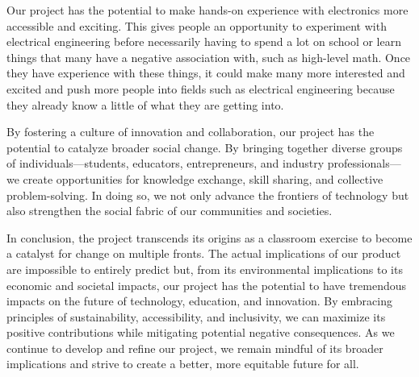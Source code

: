 Our project has the potential to make hands-on experience with electronics more accessible and exciting. This gives people an opportunity to experiment with electrical engineering before necessarily having to spend a lot on school or learn things that many have a negative association with, such as high-level math. Once they have experience with these things, it could make many more interested and excited and push more people into fields such as electrical engineering because they already know a little of what they are getting into.

By fostering a culture of innovation and collaboration, our project has the potential to catalyze broader social change. By bringing together diverse groups of individuals—students, educators, entrepreneurs, and industry professionals—we create opportunities for knowledge exchange, skill sharing, and collective problem-solving. In doing so, we not only advance the frontiers of technology but also strengthen the social fabric of our communities and societies.

In conclusion, the project transcends its origins as a classroom exercise to become a catalyst for change on multiple fronts. The actual implications of our product are impossible to entirely predict but, from its environmental implications to its economic and societal impacts, our project has the potential to have tremendous impacts on the future of technology, education, and innovation. By embracing principles of sustainability, accessibility, and inclusivity, we can maximize its positive contributions while mitigating potential negative consequences. As we continue to develop and refine our project, we remain mindful of its broader implications and strive to create a better, more equitable future for all.

